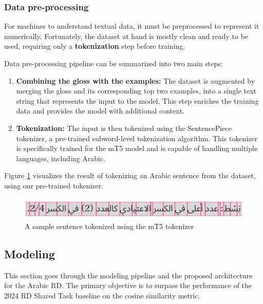 \documentclass[12pt]{article}
\begin{document}
\subsubsection{Data pre-processing}

For machines to understand textual data, it must be preprocessed to represent it numerically. Fortunately, the dataset at hand is mostly clean and ready to be used, requiring only a \textbf{tokenization} step before training.

Data pre-processing pipeline can be summarized into two main steps:

\begin{enumerate}
    \item \textbf{Combining the gloss with the examples:} The dataset is augmented by merging the gloss and its corresponding top two examples, into a single text string that represents the input to the model. This step enriches the training data and provides the model with additional context.
    \item \textbf{Tokenization:} The input is then tokenized using the SentencePiece tokenizer, a pre-trained subword-level tokenization algorithm. This tokenizer is specifically trained for the mT5 model and is capable of handling multiple languages, including Arabic.
\end{enumerate}

Figure \ref{fig:tokenized-sentence} visualizes the result of tokenizing an Arabic sentence from the dataset, using our pre-trained tokenizer.

\begin{figure}
    \centering
    \captionsetup{justification=centering}
    \includegraphics[width=\textwidth]{tokenized-sentence.png}
    \caption{A sample sentence tokenized using the mT5 tokenizer}
    \label{fig:tokenized-sentence}
\end{figure}

\subsection{Modeling}

This section goes through the modeling pipeline and the proposed architecture for the Arabic RD. The primary objective is to surpass the performance of the 2024 RD Shared Task baseline on the cosine similarity metric. 
\end{document}
